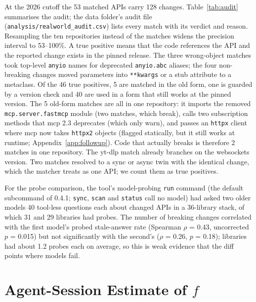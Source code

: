 \documentclass[11pt]{article}
\newcommand{\code}[1]{\texttt{#1}}
\begin{document}
At the 2026 cutoff the 53 matched APIs carry 128 changes.
Table~\ref{tab:audit} summarises the audit; the data folder's audit file (\code{analysis/realworld\_audit.csv}) lists every match with its verdict and reason. Resampling the ten repositories instead of the matches widens the precision interval to 53--100\%.
A true positive means that the code references the API and the reported change exists in the pinned release.
The three wrong-object matches took top-level \code{anyio} names for deprecated \code{anyio.abc} aliases; the four non-breaking changes moved parameters into \code{**kwargs} or a stub attribute to a metaclass.
Of the 46 true positives, 5 are matched in the old form, one is guarded by a version check and 40 are used in a form that still works at the pinned version.
The 5 old-form matches are all in one repository: it imports the removed \code{mcp.server.fastmcp} module (two matches, which break), calls two subscription methods that mcp 2.3 deprecates (which only warn), and passes an \code{httpx} client where mcp now takes \code{httpx2} objects (flagged statically, but it still works at runtime; Appendix~\ref{app:followup}). Code that actually breaks is therefore 2 matches in one repository.
The yt-dlp match already branches on the websockets version.
Two matches resolved to a sync or async twin with the identical change, which the matcher treats as one API; we count them as true positives.

For the probe comparison, the tool's model-probing \code{run} command (the default subcommand of 0.4.1; \code{sync}, \code{scan} and \code{status} call no model) had asked two older models 40 tool-less questions each about changed APIs in a 36-library stack, of which 31 and 29 libraries had probes. The number of breaking changes correlated with the first model's probed stale-answer rate (Spearman $\rho$ = 0.43, uncorrected $p$ = 0.015) but not significantly with the second's ($\rho$ = 0.26, $p$ = 0.18); libraries had about 1.2 probes each on average, so this is weak evidence that the diff points where models fail.

\section{Agent-Session Estimate of \texorpdfstring{$f$}{f}}
\label{app:fsess}
\end{document}

